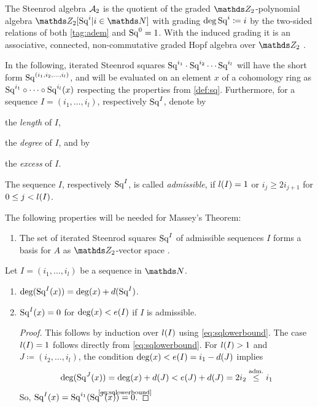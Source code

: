 \begin{Def}
  The Steenrod algebra $\mathcal{A}_2$ is the quotient
  of the graded $\Zmod2$-polynomial algebra
  $\Zmod2[\Sq i|i\in\Nat]$ with grading $\deg \mathrm{Sq}^{i}\coloneqq i$
  by the two-sided relations of both \ref{tag:adem} and $\mathrm{Sq}^{0}=1$.
  With the induced grading it is an associative, connected,
  non-commutative graded Hopf algebra over $\Zmod2$
  \cite[Chap.~6]{mosher}.
\end{Def}
\begin{Not}
  In the following, iterated Steenrod squares
  $\mathrm{Sq}^{i_1}\cdot\mathrm{Sq}^{i_2}\dotsm\mathrm{Sq}^{i_l}$ will have the short form
  $\mathrm{Sq}^{(i_1,i_2,\dotsc,i_l)}$,
  and will be evaluated on an element $x$ of a cohomology ring as
  $\mathrm{Sq}^{i_1}\circ\dotsb\circ\mathrm{Sq}^{i_l}(x)$ respecting the
  properties from \autoref{def:sq}.
  Furthermore, for a sequence $I=(i_1,\dotsc,i_l)$,
  respectively $\mathrm{Sq}^{I}$, denote by
  \begin{description}[labelindent=1em]
  \item[$\l(I)\coloneqq l$] the \emph{length} of $I$,
  \item[$\d(I)\coloneqq \sum_{j=0}^{l} i_j$] the \emph{degree} of $I$,
    and by
  \item[$\e(I)\coloneqq 2i_1-\d(I)=\sum_{j=1}^{l-1}(i_j-2i_{j+1})$]
    the \emph{excess} of $I$.
  \end{description}
  The sequence $I$, respectively $\mathrm{Sq}^{I}$, is called \emph{admissible},
  if $l(I)=1$ or $i_j\geq 2i_{j+1}$ for $0\leq j<l(I)$.
\end{Not}

\begin{Rem}\label{rem:sq}
  The following properties will be needed for Massey's Theorem:
  \begin{enumerate}
  \item The set of iterated Steenrod squares $\mathrm{Sq}^{I}$ of admissible
    sequences $I$ forms a basis for $A$ as $\Zmod2$-vector space
    \cite[Chap.~6, Theorem~1]{mosher}.
  \end{enumerate}
  Let $I=(i_1,\dotsc,i_l)$ be a sequence in $\Nat$.
  \begin{enumerate}[resume*]
  \item $\deg(\mathrm{Sq}^{I}(x)) = \deg(x) + d(\mathrm{Sq}^{I})$.
  \item\label{item:squpperboundgeneral} $\mathrm{Sq}^{I}(x) = 0$ for  $\deg(x)<e(I)$ if $I$ is admissible.
    \begin{proof}
      This follows by induction over $l(I)$ using
      \eqref{eq:sqlowerbound}. The case $l(I)=1$ follows directly 
      from \eqref{eq:sqlowerbound}.
      For $l(I)>1$ and $J\coloneqq(i_2,\dotsc,i_l)$, the condition
      $\deg(x) < e(I)=i_1-d(J)$
      implies
      \begin{gather*}
        \deg(\mathrm{Sq}^{J}(x))
        = \deg(x)+d(J) < e(J)+d(J) = 2i_2
        \overset{\text{adm.}}\leq i_1
      \end{gather*}
      So,
      $\Sq I(x)=\Sq{i_1}(\Sq J(x)) \cequalsby{\eqref{eq:sqlowerbound}} 0$.
    \end{proof}
  \end{enumerate}
\end{Rem}

